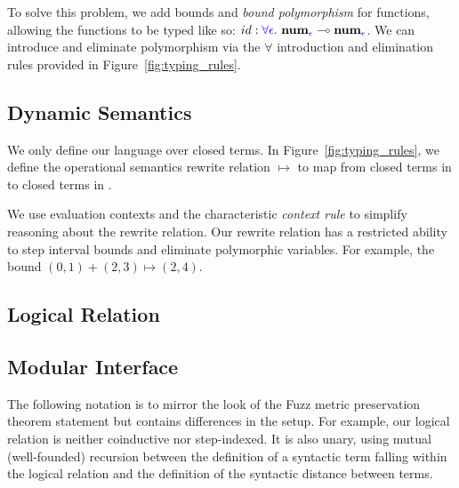 To solve this problem, we add bounds and \textit{bound polymorphism} for
functions, allowing the functions to be typed like so: $id : \textcolor{blue}{\forall
\epsilon.} ~ \textbf{num}_{\textcolor{blue}{\epsilon}} \multimap
\textbf{num}_{\textcolor{blue}{\epsilon}}$. We can introduce and eliminate polymorphism via
the $\forall$ introduction and elimination rules provided in
Figure~\ref{fig:typing_rules}.



\subsection{Dynamic Semantics}
We only define our language over closed terms. In Figure~\ref{fig:typing_rules},
we define the operational semantics rewrite relation $\mapsto$ to map from
closed terms in \Lang to closed terms in \Lang.

We use evaluation contexts and the characteristic \textit{context rule} to
simplify reasoning about the rewrite relation. Our rewrite relation has a
restricted ability to step interval bounds and eliminate polymorphic variables.
For example, the bound $(0, 1) + (2,3) \mapsto (2, 4)$.



\subsection{Logical Relation}


\subsection{Modular Interface}
The following notation is to mirror the look of the Fuzz metric preservation
theorem statement but contains differences in the setup. For example, our
logical relation is neither coinductive nor step-indexed. It is also unary,
using mutual (well-founded) recursion between the definition of a syntactic term
falling within the logical relation and the definition of the syntactic distance
between terms.

